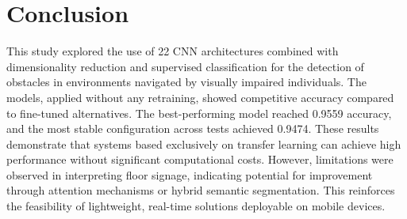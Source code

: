 \documentclass[preprint,12pt]{elsarticle}
\begin{document}
\section*{Conclusion}
This study explored the use of 22 CNN architectures combined with dimensionality reduction and supervised classification for the detection of obstacles in environments navigated by visually impaired individuals. The models, applied without any retraining, showed competitive accuracy compared to fine-tuned alternatives. The best-performing model reached 0.9559 accuracy, and the most stable configuration across tests achieved 0.9474. These results demonstrate that systems based exclusively on transfer learning can achieve high performance without significant computational costs. However, limitations were observed in interpreting floor signage, indicating potential for improvement through attention mechanisms or hybrid semantic segmentation. This reinforces the feasibility of lightweight, real-time solutions deployable on mobile devices.




\end{document}

